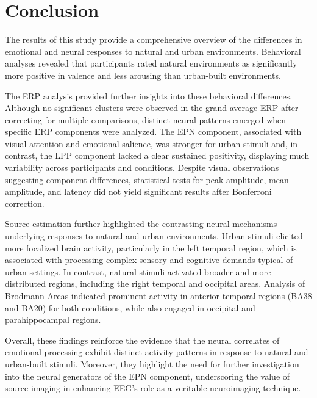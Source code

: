 
\chapter{Conclusion}
\label{chapter:conclusions}

The results of this study provide a comprehensive overview of the differences in emotional and neural responses to natural and urban environments. Behavioral analyses revealed that participants rated natural environments as significantly more positive in valence and less arousing than urban-built environments. 

The ERP analysis provided further insights into these behavioral differences. Although no significant clusters were observed in the grand-average ERP after correcting for multiple comparisons, distinct neural patterns emerged when specific ERP components were analyzed. The EPN component, associated with visual attention and emotional salience, was stronger for urban stimuli and, in contrast, the LPP component lacked a clear sustained positivity, displaying much variability across participants and conditions. Despite visual observations suggesting component differences, statistical tests for peak amplitude, mean amplitude, and latency did not yield significant results after Bonferroni correction.

Source estimation further highlighted the contrasting neural mechanisms underlying responses to natural and urban environments. Urban stimuli elicited more focalized brain activity, particularly in the left temporal region, which is associated with processing complex sensory and cognitive demands typical of urban settings. In contrast, natural stimuli activated broader and more distributed regions, including the right temporal and occipital areas. Analysis of Brodmann Areas indicated prominent activity in anterior temporal regions (BA38 and BA20) for both conditions, while also engaged in occipital and parahippocampal regions.


Overall, these findings reinforce the evidence that the neural correlates of emotional processing exhibit distinct activity patterns in response to natural and urban-built stimuli. Moreover, they highlight the need for further investigation into the neural generators of the EPN component, underscoring the value of source imaging in enhancing EEG's role as a veritable neuroimaging technique.


